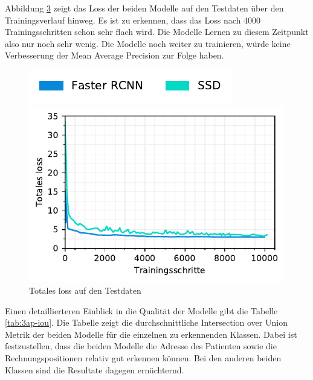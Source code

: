 \begin{figure}[H]
\begin{subfigure}[t]{0.5\linewidth}
    \label{fig:3ap-map:map_val}
    \vspace{2ex}
  \end{subfigure}
\end{figure}

Abbildung \ref{fig:3ap-map:loss} zeigt das Loss der beiden Modelle auf den Testdaten über den Trainingsverlauf hinweg. Es ist zu erkennen, dass das Loss nach 4000 Trainingsschritten schon sehr flach wird. Die Modelle Lernen zu diesem Zeitpunkt also nur noch sehr wenig. Die Modelle noch weiter zu trainieren, würde keine Verbesserung der Mean Average Precision zur Folge haben.

\begin{figure}[h!] 
    \captionsetup{width=.9\linewidth}
    \caption{Totales loss auf den Testdaten}
    \label{fig:3ap-map:loss}
    \centering
    \includegraphics[scale=1]{graphics/matplot/img-detection__legend_1.pdf}
    
    \includegraphics[scale=1]{graphics/matplot/img-detection__all__loss.pdf}
\end{figure}

Einen detaillierteren Einblick in die Qualität der Modelle gibt die Tabelle \ref{tab:3ap-iou}. Die Tabelle zeigt die durchschnittliche Intersection over Union Metrik der beiden Modelle für die einzelnen zu erkennenden Klassen. Dabei ist festzustellen, dass die beiden Modelle die Adresse des Patienten sowie die Rechnungspositionen relativ gut erkennen können. Bei den anderen beiden Klassen sind die Resultate dagegen ernüchternd.

